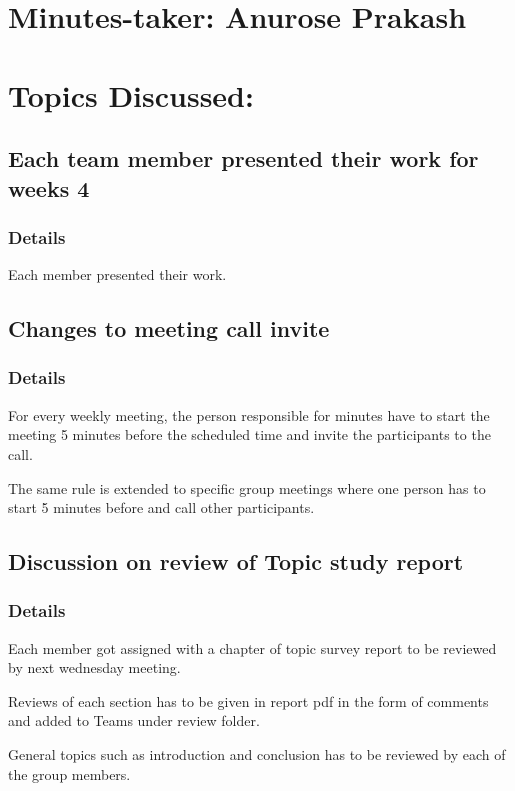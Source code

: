 \documentclass[11pt]{meetingmins} %
\begin{document}
\maketitle

\section{Minutes-taker: Anurose Prakash}

\section{Topics Discussed:}

\subsection{Each team member presented their work for weeks 4}
\subsubsection{Details}
\begin{hiddensubitems}
    \item
    Each member presented their work.
\end{hiddensubitems}

\subsection{Changes to meeting call invite}
\subsubsection{Details}
\begin{hiddensubitems}
    \item
    For every weekly meeting, the person responsible for minutes have to start the meeting 5 minutes before the scheduled time and invite the participants to the call.
    \item
    The same rule is extended to specific group meetings where one person has to start 5 minutes before and call other participants.
\end{hiddensubitems}


\subsection{Discussion on review of Topic study report}
\subsubsection{Details}
\begin{hiddensubitems}
    \item
    Each member got assigned with a chapter of topic survey report to be reviewed by next wednesday meeting. 
    \item
    Reviews of each section has to be given in report pdf in the form of comments and added to Teams under review folder.
    \item
    General topics such as introduction and conclusion has to be reviewed by each of the group members.    
\end{hiddensubitems}
\end{document}
